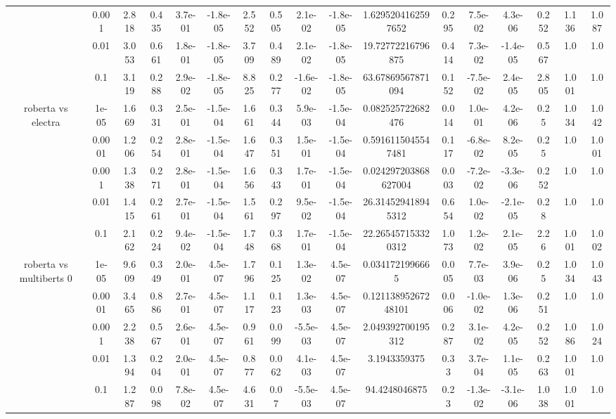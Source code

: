 \begin{tabular}{|c|c|c|c|c|c|c|c|c|c|c|c|c|c|c|c|c|}
 & 0.001 & 2.818 & 0.435 & 3.7e-01 & -1.8e-05 & 2.552 & 0.505 & 2.1e-02 & -1.8e-05 & 1.6295204162597652 & 0.295 & 7.5e-02 & 4.3e-06 & 0.252 & 1.136 & 1.087 \\
 & 0.01 & 3.053 & 0.661 & 1.8e-01 & -1.8e-05 & 3.709 & 0.489 & 2.1e-02 & -1.8e-05 & 19.72772216796875 & 0.414 & 7.3e-02 & -1.4e-05 & 0.567 & 1.0 & 1.0 \\
 & 0.1 & 3.119 & 0.288 & 2.9e-02 & -1.8e-05 & 8.825 & 0.277 & -1.6e-02 & -1.8e-05 & 63.67869567871094 & 0.152 & -7.5e-02 & 2.4e-05 & 2.805 & 1.001 & 1.0 \\
\hline
\multirow{5}{*}{roberta  vs electra } & 1e-05 & 1.669 & 0.331 & 2.5e-01 & -1.5e-04 & 1.661 & 0.344 & 5.9e-03 & -1.5e-04 & 0.082525722682476 & 0.014 & 1.0e-01 & 4.2e-06 & 0.25 & 1.034 & 1.042 \\
 & 0.0001 & 1.206 & 0.254 & 2.8e-01 & -1.5e-04 & 1.647 & 0.351 & 1.5e-01 & -1.5e-04 & 0.5916115045547481 & 0.117 & -6.8e-02 & 8.2e-05 & 0.25 & 1.0 & 1.001 \\
 & 0.001 & 1.338 & 0.271 & 2.8e-01 & -1.5e-04 & 1.656 & 0.343 & 1.7e-01 & -1.5e-04 & 0.024297203868627004 & 0.003 & -7.2e-02 & -3.3e-06 & 0.252 & 1.0 & 1.0 \\
 & 0.01 & 1.415 & 0.261 & 2.7e-01 & -1.5e-04 & 1.561 & 0.297 & 9.5e-02 & -1.5e-04 & 26.314529418945312 & 0.654 & 1.0e-02 & -2.1e-05 & 0.28 & 1.0 & 1.0 \\
 & 0.1 & 2.162 & 0.224 & 9.4e-02 & -1.5e-04 & 1.748 & 0.368 & 1.7e-01 & -1.5e-04 & 22.265457153320312 & 1.073 & 1.2e-02 & 2.1e-05 & 2.26 & 1.001 & 1.002 \\
\hline
\multirow{5}{*}{roberta  vs multiberts 0} & 1e-05 & 9.609 & 0.349 & 2.0e-01 & 4.5e-07 & 1.796 & 0.125 & 1.3e-02 & 4.5e-07 & 0.0341721996665 & 0.005 & 7.7e-03 & 3.9e-06 & 0.25 & 1.034 & 1.043 \\
 & 0.0001 & 3.465 & 0.886 & 2.7e-01 & 4.5e-07 & 1.117 & 0.123 & 1.3e-03 & 4.5e-07 & 0.12113895267248101 & 0.006 & -1.0e-02 & 1.3e-06 & 0.251 & 1.0 & 1.0 \\
 & 0.001 & 2.238 & 0.567 & 2.6e-01 & 4.5e-07 & 0.961 & 0.099 & -5.5e-03 & 4.5e-07 & 2.049392700195312 & 0.287 & 3.1e-02 & 4.2e-05 & 0.252 & 1.086 & 1.024 \\
 & 0.01 & 1.394 & 0.204 & 2.0e-01 & 4.5e-07 & 0.877 & 0.062 & 4.1e-03 & 4.5e-07 & 3.1943359375 & 0.33 & 3.7e-04 & 1.1e-05 & 0.263 & 1.001 & 1.0 \\
 & 0.1 & 1.287 & 0.098 & 7.8e-02 & 4.5e-07 & 4.631 & 0.07 & -5.5e-03 & 4.5e-07 & 94.4248046875 & 0.23 & -1.3e-02 & -3.1e-06 & 1.038 & 1.001 & 1.0 \\

\end{tabular}

